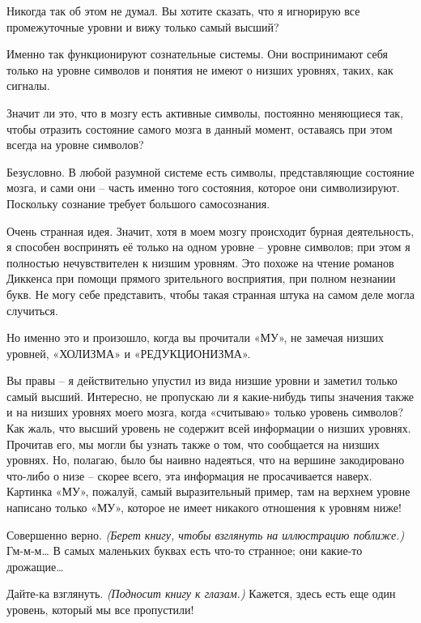 \documentclass[../main.tex]{subfiles}
\begin{document}
\begin{dialogue}
 Никогда так об этом не думал. Вы хотите сказать, что я игнорирую все промежуточные уровни и вижу только самый высший?

 Именно так функционируют сознательные системы. Они воспринимают себя только на уровне символов и понятия не имеют о низших уровнях, таких, как сигналы.

 Значит ли это, что в мозгу есть активные символы, постоянно меняющиеся так, чтобы отразить состояние самого мозга в данный момент, оставаясь при этом всегда на уровне символов?

 Безусловно. В любой разумной системе есть символы, представляющие состояние мозга, и сами они \--- часть именно того состояния, которое они символизируют. Поскольку сознание требует большого самосознания.

 Очень странная идея. Значит, хотя в моем мозгу происходит бурная деятельность, я способен воспринять её только на одном уровне \--- уровне символов; при этом я полностью нечувствителен к низшим уровням. Это похоже на чтение романов Диккенса при помощи прямого зрительного восприятия, при полном незнании букв. Не могу себе представить, чтобы такая странная штука на самом деле могла случиться.

 Но именно это и произошло, когда вы прочитали «МУ», не замечая низших уровней, «ХОЛИЗМА» и «РЕДУКЦИОНИЗМА».

 Вы правы \--- я действительно упустил из вида низшие уровни и заметил только самый высший. Интересно, не пропускаю ли я какие-нибудь типы значения также и на низших уровнях моего мозга, когда «считываю» только уровень символов? Как жаль, что высший уровень не содержит всей информации о низших уровнях. Прочитав его, мы могли бы узнать также о том, что сообщается на низших уровнях. Но, полагаю, было бы наивно надеяться, что на вершине закодировано что-либо о низе \--- скорее всего, эта информация не просачивается наверх. Картинка «МУ», пожалуй, самый выразительный пример, там на верхнем уровне написано только «МУ», которое не имеет никакого отношения к уровням ниже!

 Совершенно верно. \emph{(Берет книгу, чтобы взглянуть на иллюстрацию поближе.)} Гм-м-м\ldots{} В самых маленьких буквах есть что-то странное; они какие-то дрожащие\ldots{}

 Дайте-ка взглянуть. \emph{(Подносит книгу к глазам.)} Кажется, здесь есть еще один уровень, который мы все пропустили!


\end{dialogue}
\end{document}
